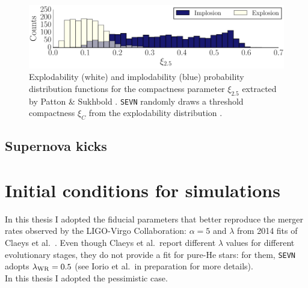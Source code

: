 \documentclass[a4paper,titlepage]{book}     	%
\begin{document}
\begin{figure}
	\centering
	\includegraphics[width=.9\textwidth]{./images/compactness.png}	
	\caption{Explodability (white) and implodability (blue) probability distribution functions for the compactness parameter $\xi_{2.5}$ extracted by Patton \& Sukhbold \cite{COcollapse}. \texttt{SEVN} randomly draws a threshold compactness $\xi_C$ from the explodability distribution \cite{mapelli2020_compactness}.}\label{fig:compactness}
\end{figure}



\subsection{Supernova kicks}\label{subsec:kicksSEVN}


\section{Initial conditions for simulations}\label{sec:initialconditionsSEVN}


In this thesis I adopted the fiducial parameters that better reproduce the merger rates observed by the LIGO-Virgo Collaboration: $\alpha=5$ and $\lambda$ from 2014 fits of Claeys et al.\ \cite{Clayes2014_lambdaCE}. Even though Claeys et al.\ report different $\lambda$ values for different evolutionary stages, they do not provide a fit for pure-He stars: for them, \texttt{SEVN} adopts $\lambda_{\rm WR} = 0.5$  (see Iorio et al.\ in preparation for more details).\\

In this thesis I adopted the pessimistic case.\\



\end{document}
